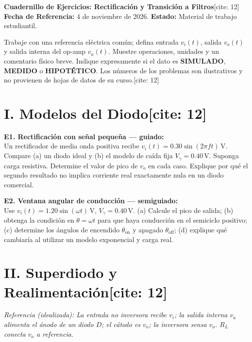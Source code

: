\documentclass[10pt, a4paper]{article}
\begin{document}
\begin{center}
    {\Large\textbf{\textcolor{ucbblue}{Cuadernillo de Ejercicios: Rectificación y Transición a Filtros}}}[cite: 12] \\[0.1cm]
    {\footnotesize\textbf{Fecha de Referencia:} 4 de noviembre de 2026. \textbf{Estado:} Material de trabajo estudiantil.}
\end{center}

\begin{tcolorbox}[colback=white, colframe=black, boxsep=1pt, top=2pt, bottom=2pt, title=\textbf{Instrucciones para el Estudiante}]
    \footnotesize\raggedright
    Trabaje con una referencia eléctrica común; defina entrada $v_i(t)$, salida $v_o(t)$ y salida interna del op-amp $v_a(t)$. Muestre operaciones, unidades y un comentario físico breve. Indique expresamente si el dato es \textbf{SIMULADO}, \textbf{MEDIDO} o \textbf{HIPOTÉTICO}. Los números de los problemas son ilustrativos y no provienen de hojas de datos de su curso.[cite: 12]
\end{tcolorbox}

\section*{I. Modelos del Diodo[cite: 12]}
\textbf{E1. Rectificación con señal pequeña — guiado:}\\
Un rectificador de media onda positiva recibe $v_i(t) = 0.30 \sin(2\pi f t)\,\text{V}$. Compare (a) un diodo ideal y (b) el modelo de caída fija $V_\gamma = 0.40\,\text{V}$. Suponga carga resistiva. Determine el valor de pico de $v_o$ en cada caso. Explique por qué el segundo resultado no implica corriente real exactamente nula en un diodo comercial.

\vspace{1.5cm}

\noindent\textbf{E2. Ventana angular de conducción — semiguiado:}\\
Use $v_i(t) = 1.20 \sin(\omega t)\,\text{V}$, $V_\gamma = 0.40\,\text{V}$. (a) Calcule el pico de salida; (b) obtenga la condición en $\theta = \omega t$ para que haya conducción en el semiciclo positivo; (c) determine los ángulos de encendido $\theta_{\mathrm{on}}$ y apagado $\theta_{\mathrm{off}}$; (d) explique qué cambiaría al utilizar un modelo exponencial y carga real.

\vspace{2.0cm}

\section*{II. Superdiodo y Realimentación[cite: 12]}
\textit{Referencia (idealizada): La entrada no inversora recibe $v_i$; la salida interna $v_a$ alimenta el ánodo de un diodo $D$; el cátodo es $v_o$; la inversora sensa $v_o$. $R_L$ conecta $v_o$ a referencia.}
\end{document}
